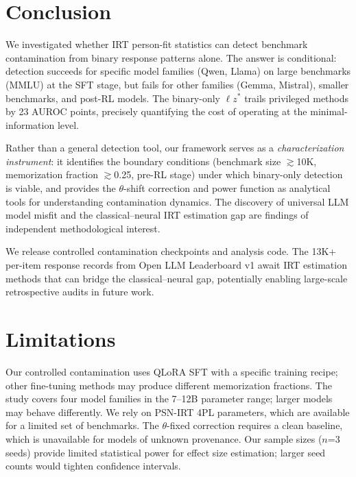 \documentclass[11pt,a4paper]{article}
\newcommand{\lzstar}{\ensuremath{\ell z^*}}
\begin{document}
\section{Conclusion}

We investigated whether IRT person-fit statistics can detect benchmark contamination from binary response patterns alone.
The answer is conditional: detection succeeds for specific model families (Qwen, Llama) on large benchmarks (MMLU) at the SFT stage, but fails for other families (Gemma, Mistral), smaller benchmarks, and post-RL models.
The binary-only $\lzstar$ trails privileged methods by 23 AUROC points, precisely quantifying the cost of operating at the minimal-information level.

Rather than a general detection tool, our framework serves as a \emph{characterization instrument}: it identifies the boundary conditions (benchmark size $\gtrsim$10K, memorization fraction $\gtrsim$0.25, pre-RL stage) under which binary-only detection is viable, and provides the $\theta$-shift correction and power function as analytical tools for understanding contamination dynamics.
The discovery of universal LLM model misfit and the classical--neural IRT estimation gap are findings of independent methodological interest.

We release controlled contamination checkpoints and analysis code.
The 13K+ per-item response records from Open LLM Leaderboard v1 await IRT estimation methods that can bridge the classical--neural gap, potentially enabling large-scale retrospective audits in future work.

\section*{Limitations}

Our controlled contamination uses QLoRA SFT with a specific training recipe; other fine-tuning methods may produce different memorization fractions.
The study covers four model families in the 7--12B parameter range; larger models may behave differently.
We rely on PSN-IRT 4PL parameters, which are available for a limited set of benchmarks.
The $\theta$-fixed correction requires a clean baseline, which is unavailable for models of unknown provenance.
Our sample sizes ($n$=3 seeds) provide limited statistical power for effect size estimation; larger seed counts would tighten confidence intervals.
\end{document}
